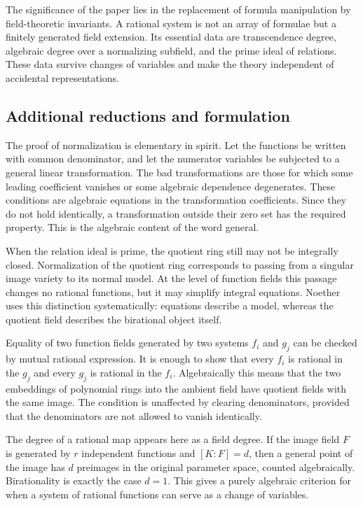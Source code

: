 \documentclass[12pt]{article}
\begin{document}
The significance of the paper lies in the replacement of formula manipulation by field-theoretic
invariants. A rational system is not an array of formulae but a finitely generated field extension.
Its essential data are transcendence degree, algebraic degree over a normalizing subfield, and the
prime ideal of relations. These data survive changes of variables and make the theory independent of
accidental representations.


\subsection{Additional reductions and formulation}

The proof of normalization is elementary in spirit. Let the functions be written with common
denominator, and let the numerator variables be subjected to a general linear transformation. The
bad transformations are those for which some leading coefficient vanishes or some algebraic
dependence degenerates. These conditions are algebraic equations in the transformation coefficients.
Since they do not hold identically, a transformation outside their zero set has the required
property. This is the algebraic content of the word general.

When the relation ideal is prime, the quotient ring still may not be integrally closed.
Normalization of the quotient ring corresponds to passing from a singular image variety to its
normal model. At the level of function fields this passage changes no rational functions, but it may
simplify integral equations. Noether uses this distinction systematically: equations describe a
model, whereas the quotient field describes the birational object itself.

Equality of two function fields generated by two systems \(f_i\) and \(g_j\) can be checked by
mutual rational expression. It is enough to show that every \(f_i\) is rational in the \(g_j\) and
every \(g_j\) is rational in the \(f_i\). Algebraically this means that the two embeddings of
polynomial rings into the ambient field have quotient fields with the same image. The condition is
unaffected by clearing denominators, provided that the denominators are not allowed to vanish
identically.

The degree of a rational map appears here as a field degree. If the image field \(F\) is generated
by \(r\) independent functions and \([K:F]=d\), then a general point of the image has \(d\)
preimages in the original parameter space, counted algebraically. Birationality is exactly the case
\(d=1\). This gives a purely algebraic criterion for when a system of rational functions can serve
as a change of variables.
\end{document}
